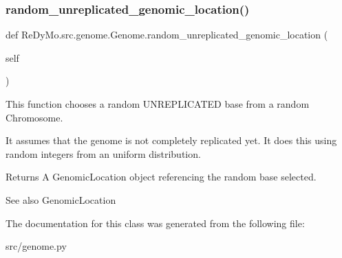 \subsubsection{\texorpdfstring{random\+\_\+unreplicated\+\_\+genomic\+\_\+location()}{random\_unreplicated\_genomic\_location()}}
{\footnotesize\ttfamily def Re\+Dy\+Mo.\+src.\+genome.\+Genome.\+random\+\_\+unreplicated\+\_\+genomic\+\_\+location (\begin{DoxyParamCaption}\item[{}]{self }\end{DoxyParamCaption})}



This function chooses a random U\+N\+R\+E\+P\+L\+I\+C\+A\+T\+ED base from a random Chromosome. 

It assumes that the genome is not completely replicated yet. It does this using random integers from an uniform distribution. \begin{DoxyReturn}{Returns}
A Genomic\+Location object referencing the random base selected. 
\end{DoxyReturn}
\begin{DoxySeeAlso}{See also}
Genomic\+Location 
\end{DoxySeeAlso}


The documentation for this class was generated from the following file\+:\begin{DoxyCompactItemize}
\item 
src/genome.\+py\end{DoxyCompactItemize}
